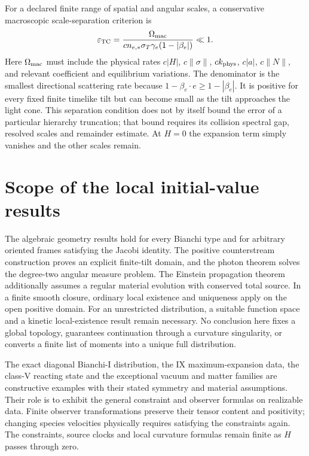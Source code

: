 For a declared finite range of spatial and angular scales, a conservative macroscopic scale-separation criterion is
\begin{equation}
 \varepsilon_{\rm TC}=
 \frac{\Omega_{\rm mac}}
 {c n_{e,*}\sigma_T\gamma_e(1-|\beta_e|)}\ll1.
 \label{geo:tight_coupling_parameter}
\end{equation}
Here $\Omega_{\rm mac}$ must include the physical rates $c|H|$, $c\|\sigma\|$, $ck_{\rm phys}$, $c|a|$, $c\|N\|$, and relevant coefficient and equilibrium variations. The denominator is the smallest directional scattering rate because $1-\beta_e\cdot e\ge1-|\beta_e|$. It is positive for every fixed finite timelike tilt but can become small as the tilt approaches the light cone. This separation condition does not by itself bound the error of a particular hierarchy truncation; that bound requires its collision spectral gap, resolved scales and remainder estimate. At $H=0$ the expansion term simply vanishes and the other scales remain.

\section{Scope of the local initial-value results}
\label{geo:scope}
The algebraic geometry results hold for every Bianchi type and for arbitrary oriented frames satisfying the Jacobi identity. The positive counterstream construction proves an explicit finite-tilt domain, and the photon theorem solves the degree-two angular measure problem. The Einstein propagation theorem additionally assumes a regular material evolution with conserved total source. In a finite smooth closure, ordinary local existence and uniqueness apply on the open positive domain. For an unrestricted distribution, a suitable function space and a kinetic local-existence result remain necessary. No conclusion here fixes a global topology, guarantees continuation through a curvature singularity, or converts a finite list of moments into a unique full distribution.

The exact diagonal Bianchi-I distribution, the IX maximum-expansion data, the class-V reacting state and the exceptional vacuum and matter families are constructive examples with their stated symmetry and material assumptions. Their role is to exhibit the general constraint and observer formulas on realizable data. Finite observer transformations preserve their tensor content and positivity; changing species velocities physically requires satisfying the constraints again. The constraints, source clocks and local curvature formulas remain finite as $H$ passes through zero.
